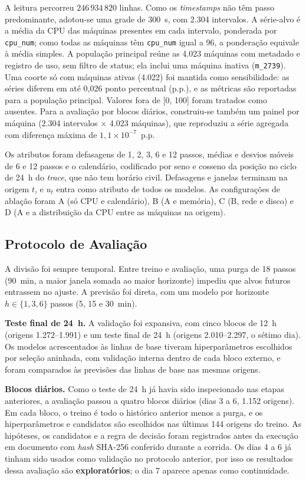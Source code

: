 \documentclass[a4paper,12pt]{article}
\begin{document}
A leitura percorreu $246\,934\,820$ linhas. Como os \textit{timestamps} não têm passo predominante, adotou-se uma grade de 300~s, com 2.304 intervalos. A série-alvo é a média da CPU das máquinas presentes em cada intervalo, ponderada por \texttt{cpu\_num}; como todas as máquinas têm \texttt{cpu\_num} igual a 96, a ponderação equivale à média simples. A população principal reúne as 4.023 máquinas com metadado e registro de uso, sem filtro de status; ela inclui uma máquina inativa (\texttt{m\_2739}). Uma coorte só com máquinas ativas (4.022) foi mantida como sensibilidade: as séries diferem em até 0,026 ponto percentual (p.p.), e as métricas são reportadas para a população principal. Valores fora de [0, 100] foram tratados como ausentes. Para a avaliação por blocos diários, construiu-se também um painel por máquina (2.304 intervalos $\times$ 4.023 máquinas), que reproduziu a série agregada com diferença máxima de $1{,}1 \times 10^{-7}$~p.p.

Os atributos foram defasagens de 1, 2, 3, 6 e 12 passos, médias e desvios móveis de 6 e 12 passos e o calendário, codificado por seno e cosseno da posição no ciclo de 24~h do \textit{trace}, que não tem horário civil. Defasagens e janelas terminam na origem $t$, e $u_t$ entra como atributo de todos os modelos. As configurações de ablação foram A (só CPU e calendário), B (A e memória), C (B, rede e disco) e D (A e a distribuição da CPU entre as máquinas na origem).

\subsection{Protocolo de Avaliação}
\label{sec:protocolo}

A divisão foi sempre temporal. Entre treino e avaliação, uma purga de 18 passos (90~min, a maior janela somada ao maior horizonte) impediu que alvos futuros entrassem no ajuste. A previsão foi direta, com um modelo por horizonte $h \in \{1, 3, 6\}$ passos (5, 15 e 30~min).

\textbf{Teste final de 24~h.} A validação foi expansiva, com cinco blocos de 12~h (origens 1.272--1.991) e um teste final de 24~h (origens 2.010--2.297, o sétimo dia). Os modelos acrescentados às linhas de base tiveram hiperparâmetros escolhidos por seleção aninhada, com validação interna dentro de cada bloco externo, e foram comparados às previsões das linhas de base nas mesmas origens.

\textbf{Blocos diários.} Como o teste de 24~h já havia sido inspecionado nas etapas anteriores, a avaliação passou a quatro blocos diários (dias 3 a 6, 1.152 origens). Em cada bloco, o treino é todo o histórico anterior menos a purga, e os hiperparâmetros e candidatos são escolhidos nas últimas 144 origens do treino. As hipóteses, os candidatos e a regra de decisão foram registrados antes da execução em documento com \textit{hash} SHA-256 conferido durante a corrida. Os dias 4 a 6 já tinham sido usados como validação no protocolo anterior, por isso os resultados dessa avaliação são \textbf{exploratórios}; o dia 7 aparece apenas como continuidade.
\end{document}

